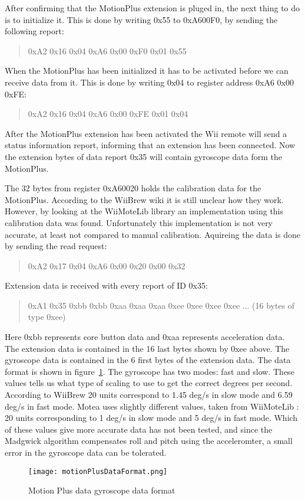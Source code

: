 After confirming that the MotionPlus extension is pluged in, the next thing to do is to initialize it. This is done by writing 0x55 to 0xA600F0, by sending the following report:
\begin{quote}
0xA2 0x16 0x04 0xA6 0x00 0xF0 0x01 0x55
\end{quote}

When the MotionPlus has been initialized it has to be activated before we can receive data from it. This is done by writing 0x04 to register address 0xA6 0x00 0xFE:
\begin{quote}
0xA2 0x16 0x04 0xA6 0x00 0xFE 0x01 0x04
\end{quote}
After the MotionPlus extension has been activated the Wii remote will send a status information report, informing that an extension has been connected. Now the extension bytes of data report 0x35 will contain gyroscope data form the MotionPlus.

The 32 bytes from register 0xA60020 holds the calibration data for the MotionPlus. According to the WiiBrew wiki \cite{wiiBrew} it is still unclear how they work. However, by looking at the WiiMoteLib \cite{wiiMoteLib} library an implementation using this calibration data was found. Unfortunately this implementation is not very accurate, at least not compared to manual calibration. Aquireing the data is done by sending the read request:
\begin{quote}
0xA2 0x17 0x04 0xA6 0x00 0x20 0x00 0x32
\end{quote}

Extension data is received with every report of ID 0x35:
\begin{quote}
0xA1 0x35 0xbb 0xbb 0xaa 0xaa 0xaa 0xee 0xee 0xee 0xee ... (16 bytes of type 0xee)
\end{quote}
Here 0xbb represents core button data and 0xaa represents acceleration data. The extension data is contained in the 16 last bytes shown by 0xee above. The gyroscope data is contained in the 6 first bytes of the extension data. The data format is shown in figure~\ref{fig:motionPlusDataFormat}. The gyroscope has two modes: fast and slow. These values tells us what type of scaling to use to get the correct degrees per second. According to WiiBrew \cite{wiiBrew} 20 units correspond to 1.45 deg/s in slow mode and 6.59 deg/s in fast mode. Motea uses slightly different values, taken from WiiMoteLib \cite{wiiMoteLib}: 20 units corresponding to 1 deg/s in slow mode and 5 deg/s in fast mode. Which of these values give more accurate data has not been tested, and since the Madgwick algorithm \cite{madgwick} compensates roll and pitch using the acceleromter, a small error in the gyroscope data can be tolerated. 
\begin{figure}[h!]
  \centering
    \texttt{[image: motionPlusDataFormat.png]}
    \caption{\footnotesize Motion Plus data gyroscope data format}
    \label{fig:motionPlusDataFormat}
\end{figure}

